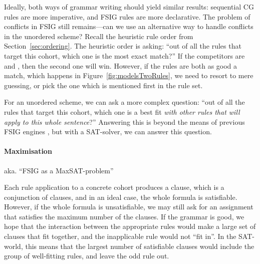 Ideally, both ways of grammar writing should yield similar results:
sequential CG rules are more imperative, and FSIG rules are more declarative.
The problem of conflicts in FSIG still remains---can we use an alternative way to handle conflicts in the unordered scheme?
%
%
Recall the heuristic rule order from Section~\ref{sec:ordering}. The heuristic order is asking: ``out of all the rules that target this cohort, which one is the most exact match?'' If the competitors are  and , then the second one will win. However, if the rules are both as good a match, which happens in Figure~\ref{fig:modelsTwoRules}, we need to resort to mere guessing, or pick the one which is mentioned first in the rule set.

For an unordered scheme, we can ask a more complex question: ``out of all the rules that target this cohort, which one is a best fit \emph{with other rules that will apply to this whole sentence}?''
Answering this is beyond the means of previous FSIG engines , but with a SAT-solver, we can answer this question. 

\paragraph{Maximisation} aka. ``FSIG as a MaxSAT-problem''

Each rule application to a concrete cohort produces a clause, 
 which is a conjunction of clauses, and in an ideal case, the whole formula is satisfiable. However, if the whole formula is unsatisfiable, we may still ask for an assignment that satisfies the maximum number of the clauses. 
If the grammar is good, we hope that the interaction between the appropriate
rules would make a large set of clauses that fit together, and the
inapplicable rule would not ``fit in''.
In the SAT-world, this means that the largest number of satisfiable clauses would include the group of well-fitting rules, and leave the odd rule out.


